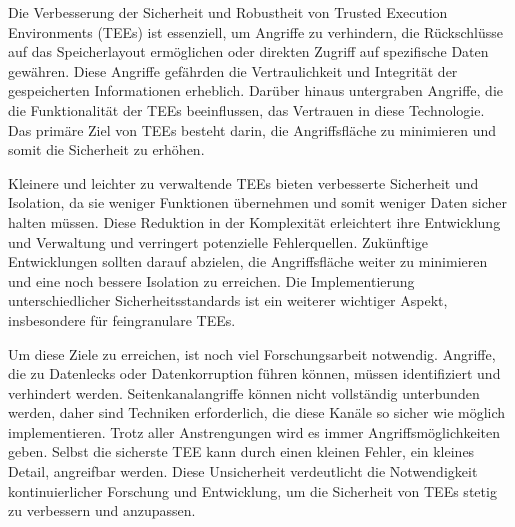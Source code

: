 
Die Verbesserung der Sicherheit und Robustheit von Trusted Execution Environments (TEEs) ist essenziell, um Angriffe zu verhindern, die Rückschlüsse auf das Speicherlayout ermöglichen oder direkten Zugriff auf spezifische Daten gewähren. Diese Angriffe gefährden die Vertraulichkeit und Integrität der gespeicherten Informationen erheblich. Darüber hinaus untergraben Angriffe, die die Funktionalität der TEEs beeinflussen, das Vertrauen in diese Technologie. Das primäre Ziel von TEEs besteht darin, die Angriffsfläche zu minimieren und somit die Sicherheit zu erhöhen.

Kleinere und leichter zu verwaltende TEEs bieten verbesserte Sicherheit und Isolation, da sie weniger Funktionen übernehmen und somit weniger Daten sicher halten müssen. Diese Reduktion in der Komplexität erleichtert ihre Entwicklung und Verwaltung und verringert potenzielle Fehlerquellen. Zukünftige Entwicklungen sollten darauf abzielen, die Angriffsfläche weiter zu minimieren und eine noch bessere Isolation zu erreichen. Die Implementierung unterschiedlicher Sicherheitsstandards ist ein weiterer wichtiger Aspekt, insbesondere für feingranulare TEEs.

Um diese Ziele zu erreichen, ist noch viel Forschungsarbeit notwendig. 
Angriffe, die zu Datenlecks oder Datenkorruption führen können, müssen identifiziert und verhindert werden. Seitenkanalangriffe können nicht vollständig unterbunden werden, daher sind Techniken erforderlich, die diese Kanäle so sicher wie möglich implementieren. 
Trotz aller Anstrengungen wird es immer Angriffsmöglichkeiten geben. Selbst die sicherste TEE kann durch einen kleinen Fehler, ein kleines Detail, angreifbar werden. Diese Unsicherheit verdeutlicht die Notwendigkeit kontinuierlicher Forschung und Entwicklung, um die Sicherheit von TEEs stetig zu verbessern und anzupassen.